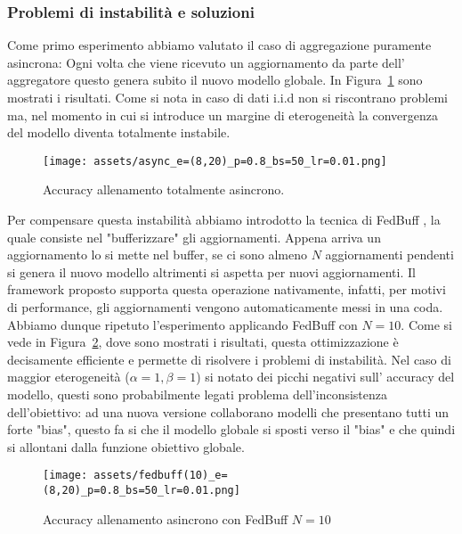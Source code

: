 \documentclass[a4paper, oneside, openright]{report}
\begin{document}
\subsubsection*{Problemi di instabilità e soluzioni}
Come primo esperimento abbiamo valutato il caso di aggregazione puramente asincrona: Ogni volta che viene ricevuto un aggiornamento da parte dell' aggregatore questo genera subito il nuovo modello globale. In Figura~\ref{fig:pure-async}
sono mostrati i risultati. Come si nota in caso di dati i.i.d non si riscontrano problemi ma, nel momento in cui si introduce un margine di eterogeneità la convergenza del modello diventa totalmente instabile.

\begin{figure}[h]
\centering
\texttt{[image: assets/async\_e=(8,20)\_p=0.8\_bs=50\_lr=0.01.png]}
\caption{Accuracy allenamento totalmente asincrono.}\label{fig:pure-async}
\end{figure}

\noindent Per compensare questa instabilità abbiamo introdotto la tecnica di FedBuff \cite{DBLP:journals/corr/abs-2106-06639},  la quale consiste nel "bufferizzare" gli aggiornamenti. Appena arriva un aggiornamento lo si mette nel buffer, se ci sono almeno $N$ aggiornamenti pendenti si genera il nuovo modello altrimenti si aspetta per nuovi aggiornamenti.
Il framework proposto supporta questa operazione nativamente, infatti, per motivi di performance, gli aggiornamenti vengono automaticamente messi in una coda. Abbiamo dunque ripetuto l'esperimento applicando FedBuff  con $N=10$. Come si vede in Figura~\ref{fig:fed-buff}, dove sono mostrati i risultati, questa ottimizzazione è decisamente efficiente e permette di risolvere i problemi di instabilità. Nel caso di maggior eterogeneità ($\alpha=1, \beta=1$) si notato dei picchi negativi sull' accuracy del modello, questi sono probabilmente legati problema dell'inconsistenza dell'obiettivo: ad una nuova versione collaborano modelli che presentano tutti un forte "bias", questo fa si che il modello globale si sposti verso il "bias" e che quindi si allontani dalla funzione obiettivo globale.

\begin{figure}[h!]
\centering
\texttt{[image: assets/fedbuff(10)\_e=(8,20)\_p=0.8\_bs=50\_lr=0.01.png]}
\caption{Accuracy allenamento asincrono con FedBuff $N=10$}\label{fig:fed-buff}
\end{figure}
\end{document}
